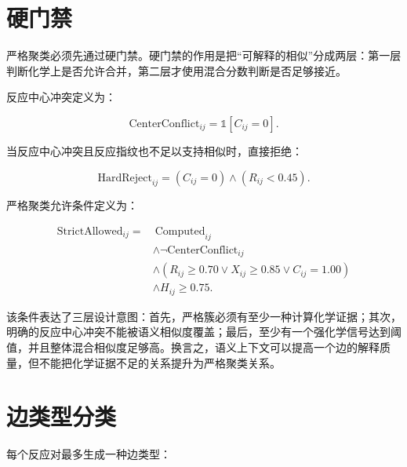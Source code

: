 \documentclass[11pt]{article}
\numberwithin{equation}{section}
\begin{document}
\section{硬门禁}

严格聚类必须先通过硬门禁。硬门禁的作用是把“可解释的相似”分成两层：第一层判断化学上是否允许合并，第二层才使用混合分数判断是否足够接近。

反应中心冲突定义为：

\begin{equation}
\mathrm{CenterConflict}_{ij}
=
\mathbb 1[C_{ij}=0].
\end{equation}

当反应中心冲突且反应指纹也不足以支持相似时，直接拒绝：

\begin{equation}
\mathrm{HardReject}_{ij}
=
(C_{ij}=0)
\land
(R_{ij}<0.45).
\end{equation}

严格聚类允许条件定义为：

\begin{equation}
\begin{aligned}
\mathrm{StrictAllowed}_{ij}
=
&\ \mathrm{Computed}_{ij} \\
&\land \neg\mathrm{CenterConflict}_{ij} \\
&\land
\left(
R_{ij}\ge 0.70
\lor
X_{ij}\ge 0.85
\lor
C_{ij}=1.00
\right) \\
&\land H_{ij}\ge 0.75.
\end{aligned}
\end{equation}

该条件表达了三层设计意图：首先，严格簇必须有至少一种计算化学证据；其次，明确的反应中心冲突不能被语义相似度覆盖；最后，至少有一个强化学信号达到阈值，并且整体混合相似度足够高。换言之，语义上下文可以提高一个边的解释质量，但不能把化学证据不足的关系提升为严格聚类关系。

\section{边类型分类}

每个反应对最多生成一种边类型：
\end{document}
